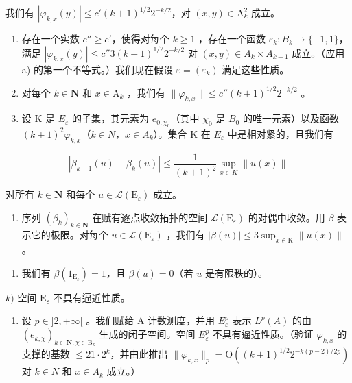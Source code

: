 我们有 \(|\varphi_{k,x}(y)| \leqslant c'(k + 1)^{1/2}2^{-k/2}\)，对 \((x,y) \in \mathrm{A}_k^2\) 成立。

\begin{enumerate}
\def\labelenumi{\alph{enumi})}
\setcounter{enumi}{5}
\item
  存在一个实数 \(c'' \geqslant c'\)，使得对每个 \(k \geqslant 1\) ，存在一个函数 \(\varepsilon_k \colon B_k \to \{-1,1\}\)，满足 \(|\varphi_{k,x}(y)| \leqslant c''3(k+1)^{1/2}2^{-k/2}\) 对 \((x,y) \in A_k \times A_{k-1}\) 成立。（应用 a) 的第一个不等式。）我们现在假设 \(\varepsilon = (\varepsilon_k)\) 满足这些性质。
\item
  对每个 \(k \in \mathbf{N}\) 和 \(x \in \mathrm{A}_k\) ，我们有 \(\| \varphi_{k,x} \| \leqslant c''(k + 1)^{1/2} 2^{-k/2}\) 。
\item
  设 K 是 \(E_{\varepsilon}\) 的子集，其元素为 \(e_{0,\chi_{0}}\)（其中 \(\chi_{0}\) 是 \(B_{0}\) 的唯一元素）以及函数 \((k+1)^{2}\varphi_{k,x}\)（\(k\in N\)，\(x\in A_{k}\)）。集合 K 在 \(E_{\varepsilon}\) 中是相对紧的，且我们有
\end{enumerate}

\[
| \beta_ {k + 1} (u) - \beta_ {k} (u) | \leqslant \frac {1}{(k + 1) ^ {2}} \sup _ {x \in K} \| u (x) \|
\]

对所有 \(k \in \mathbf{N}\) 和每个 \(u \in \mathcal{L}(\mathrm{E}_{\varepsilon})\) 成立。

\begin{enumerate}
\def\labelenumi{\roman{enumi})}
\tightlist
\item
  序列 \((\beta_{k})_{k\in \mathbf{N}}\) 在赋有逐点收敛拓扑的空间 \(\mathcal{L}(\mathrm{E}_{\varepsilon})\) 的对偶中收敛。用 \(\beta\) 表示它的极限。对每个 \(u\in \mathcal{L}(\mathrm{E}_{\varepsilon})\) ，我们有 \(|\beta (u)|\leqslant 3\sup_{x\in \mathrm{K}}\| u(x)\|\) 。
\end{enumerate}

\begin{enumerate}
\def\labelenumi{\alph{enumi})}
\setcounter{enumi}{9}
\tightlist
\item
  我们有 \(\beta(1_{\mathrm{E}_{\varepsilon}})=1\)，且 \(\beta(u)=0\)（若 \(u\) 是有限秩的）。
\end{enumerate}

\(k)\) 空间 \(\mathrm{E}_{\varepsilon}\) 不具有逼近性质。

\begin{enumerate}
\def\labelenumi{\alph{enumi})}
\setcounter{enumi}{11}
\tightlist
\item
  设 \(p \in]2, +\infty[\) 。我们赋给 A 计数测度，并用 \(E_{\varepsilon}^{p}\) 表示 \(L^{p}(A)\) 的由 \((e_{k,\chi})_{k \in \mathbf{N}, \chi \in \mathrm{B}_{k}}\) 生成的闭子空间。空间 \(E_{\varepsilon}^{p}\) 不具有逼近性质。（验证 \(\varphi_{k,x}\) 的支撑的基数 \(\leqslant 21 \cdot 2^{k}\)，并由此推出 \(\|\varphi_{k,x}\|_{p} = \mathrm{O}((k+1)^{1/2}2^{-k(p-2)/2p})\) 对 \(k \in N\) 和 \(x \in A_{k}\) 成立。）
\end{enumerate}

